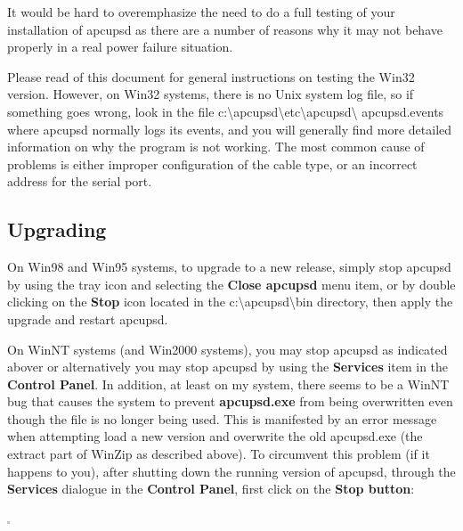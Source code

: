 {{{{{{{{{{\label{index-Windows_002c-Testing-173}
\label{index-Testing_002c-Windows-174}
It would be hard to overemphasize the need to do a full testing of your
installation of apcupsd as there are a number of reasons why it may not behave
properly in a real power failure situation.  

Please read 
 of this document for
general instructions on testing the Win32 version. However, on Win32 systems,
there is no Unix system log file, so if something goes wrong, look in the file
c:\textbackslash{}apcupsd\textbackslash{}etc\textbackslash{}apcupsd\textbackslash
{}apcupsd.events where apcupsd normally logs its events, and you will
generally find more detailed information on why the program is not working.
The most common cause of problems is either improper configuration of the
cable type, or an incorrect address for the serial port. 

\label{Upgrading}

\subsection*{Upgrading}

\label{index-Windows_002c-Upgrading-175}
\label{index-Upgrading-Windows-176}
On Win98 and Win95 systems, to upgrade to a new release, simply stop apcupsd
by using the tray icon and selecting the {\bf Close apcupsd} menu item, or by
double clicking on the {\bf Stop} icon located in the
c:\textbackslash{}apcupsd\textbackslash{}bin directory, then apply the upgrade
and restart apcupsd.  

On WinNT systems (and Win2000 systems), you may stop apcupsd as indicated
abover or alternatively you may stop apcupsd by using the {\bf Services} item
in the {\bf Control Panel}. In addition, at least on my system, there seems to
be a WinNT bug that causes the system to prevent {\bf apcupsd.exe} from being
overwritten even though the file is no longer being used.  This is manifested
by an error message when attempting load a new version and overwrite the old
apcupsd.exe (the extract part of WinZip as described above). To circumvent
this problem (if it happens to you), after shutting down the running version
of apcupsd, through the {\bf Services} dialogue in the {\bf Control Panel},
first click on the {\bf Stop button}:  

\includegraphics{./wininstall6.eps}  

}}}}}}}}}}
